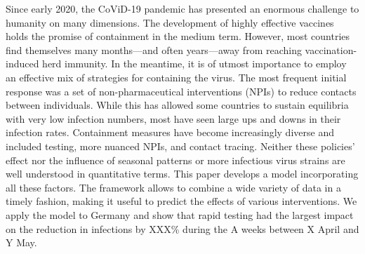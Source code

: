 



Since early 2020, the CoViD-19 pandemic has presented an enormous challenge to humanity on many dimensions. The development of highly effective vaccines holds the promise of containment in the medium term. However, most countries find themselves many months---and often years---away from reaching vaccination-induced herd immunity. In the meantime, it is of utmost importance to employ an effective mix of strategies for containing the virus. The most frequent initial response was a set of non-pharmaceutical interventions (NPIs) to reduce contacts between individuals. While this has allowed some countries to sustain equilibria with very low infection numbers, most have seen large ups and downs in their infection rates. Containment measures have become increasingly diverse and included testing, more nuanced NPIs, and contact tracing. Neither these policies' effect nor the influence of seasonal patterns or more infectious virus strains are well understood in quantitative terms. This paper develops a model incorporating all these factors. The framework allows to combine a wide variety of data in a timely fashion, making it useful to predict the effects of various interventions. We apply the model to Germany and show that rapid testing had the largest impact on the reduction in infections by XXX\% during the A weeks between X April and Y May.

